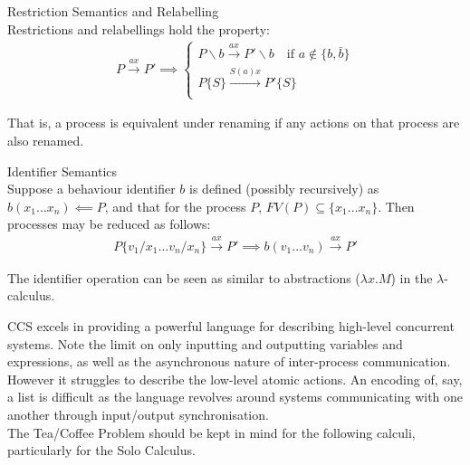     \begin{definition}{Restriction Semantics and Relabelling\\}
        Restrictions and relabellings hold the property:
        \begin{align*}
            P \xrightarrow{a x} P' \implies
            \begin{cases}
                P \backslash b \xrightarrow{a x} P ' \backslash b \quad \text{if } a \notin \{b, \bar{b}\}\\
                P\{S\} \xrightarrow{S(a) x} P'\{S\} \\
            \end{cases}
        \end{align*}
    \end{definition}
    That is, a process is equivalent under renaming if any actions on that process are also renamed.


    \begin{definition}{Identifier Semantics\\}
        Suppose a behaviour identifier $b$ is defined (possibly recursively) as $b(x_1 \ldots x_n) \impliedby P$, and that for the process $P$, $FV(P) \subseteq \{x_1 \ldots x_n\}$.
        Then processes may be reduced as follows:
        \begin{align*}
            P\{v_1 / x_1 \ldots v_n / x_n\} \xrightarrow{a x} P' \implies
            b(v_1 \ldots v_n) \xrightarrow{a x} P'
        \end{align*}
    \end{definition}
    The identifier operation can be seen as similar to abstractions ($\lambda x . M$) in the $\lambda$-calculus.


    \begin{remarks}
        CCS excels in providing a powerful language for describing high-level concurrent systems.
        Note the limit on only inputting and outputting variables and expressions, as well as the asynchronous nature of inter-process communication.
        However it struggles to describe the low-level atomic actions.
        An encoding of, say, a list is difficult as the language revolves around systems communicating with one another through input/output synchronisation. \\

        The Tea/Coffee Problem should be kept in mind for the following calculi, particularly for the Solo Calculus.
    \end{remarks}
